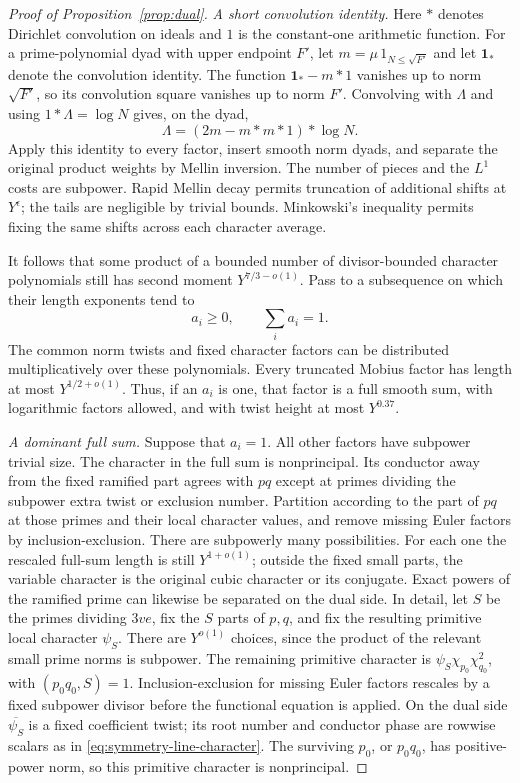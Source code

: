 \begin{proof}[Proof of Proposition~\ref{prop:dual}]
\smallskip
\noindent\emph{A short convolution identity.}
Here $*$ denotes Dirichlet convolution on ideals and $1$ is the
constant-one arithmetic function. For a prime-polynomial dyad with
upper endpoint $F'$, let
$m=\mu\,1_{N\le\sqrt{F'}}$ and let $\mathbf1_*$ denote the
convolution identity.  The function $\mathbf1_*-m*1$ vanishes up to
norm $\sqrt{F'}$, so its convolution square vanishes up to norm
$F'$.  Convolving with $\Lambda$ and using $1*\Lambda=\log N$
gives, on the dyad,
\begin{equation}
 \Lambda=(2m-m*m*1)*\log N.
 \label{eq:short-mobius-identity}
\end{equation}
Apply this identity to every factor, insert smooth norm dyads, and
separate the original product weights by Mellin inversion.  The
number of pieces and the $L^1$ costs are subpower.  Rapid Mellin
decay permits truncation of additional shifts at $Y^\epsilon$;
the tails are negligible by trivial bounds.  Minkowski's inequality
permits fixing the same shifts across each character average.

It follows that some product of a bounded number of divisor-bounded
character polynomials still has second moment
$Y^{7/3-o(1)}$.  Pass to a subsequence on which their length
exponents tend to
\[
 a_i\ge0,\qquad \sum_i a_i=1.
\]
The common norm twists and fixed character factors can be distributed
multiplicatively over these polynomials.  Every truncated Mobius
factor has length at most $Y^{1/2+o(1)}$.  Thus, if an $a_i$ is one,
that factor is a full smooth sum, with logarithmic factors allowed,
and with twist height at most $Y^{0.37}$.

\smallskip
\noindent\emph{A dominant full sum.}
Suppose that $a_i=1$.  All other factors have subpower trivial size.
The character in the full sum is nonprincipal.  Its conductor away
from the fixed ramified part agrees with $pq$ except at primes
dividing the subpower extra twist or exclusion number.  Partition
according to the part of $pq$ at those primes and their local
character values, and remove missing Euler factors by
inclusion-exclusion.  There are subpowerly many possibilities.
For each one the rescaled full-sum length is still $Y^{1+o(1)}$;
outside the fixed small parts, the variable character is the original
cubic character or its conjugate.  Exact powers of the ramified
prime can likewise be separated on the dual side.
In detail, let $S$ be the primes dividing $3ve$, fix the $S$ parts
of $p,q$, and fix the resulting primitive local character $\psi_S$.
There are $Y^{o(1)}$ choices, since the product of the relevant small
prime norms is subpower. The remaining primitive character is
$\psi_S\chi_{p_0}\chi_{q_0}^2$, with $(p_0q_0,S)=1$.
Inclusion-exclusion for missing Euler factors rescales by a fixed
subpower divisor before the functional equation is applied.
On the dual side $\overline{\psi_S}$ is a fixed coefficient twist;
its root number and conductor phase are rowwise scalars as in
\eqref{eq:symmetry-line-character}. The surviving $p_0$, or $p_0q_0$,
has positive-power norm, so this primitive character is nonprincipal.


\end{proof}
